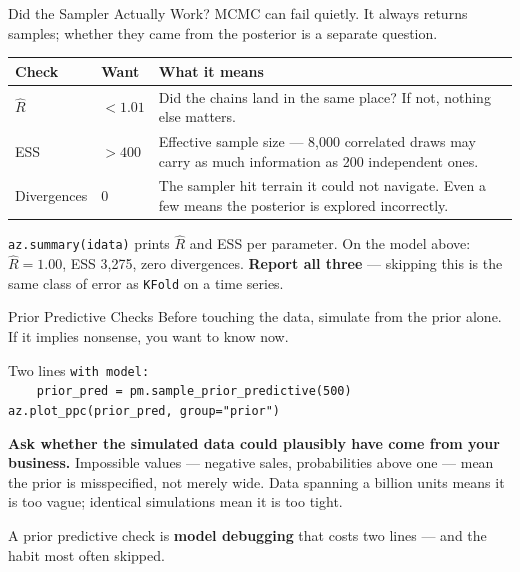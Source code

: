 \documentclass[aspectratio=169, 11pt]{beamer}
\begin{document}
\begin{frame}{Did the Sampler Actually Work? \parencite{MartinKumarLao2021}}
  MCMC can fail quietly. It always returns samples; whether they came from the posterior is a
  separate question.
  \begin{center}
    {\small
    \begin{tabular}{p{2.5cm}p{3.0cm}p{6.6cm}}
      \toprule
      \textbf{Check} & \textbf{Want} & \textbf{What it means} \\
      \midrule
      $\hat{R}$ & $< 1.01$ & Did the chains land in the same place? If not, nothing else
      matters. \\[2pt]
      ESS & $> 400$ & Effective sample size --- 8{,}000 correlated draws may carry as much
      information as 200 independent ones. \\[2pt]
      Divergences & $0$ & The sampler hit terrain it could not navigate. Even a few means the
      posterior is explored incorrectly. \\
      \bottomrule
    \end{tabular}
    }
  \end{center}

  \texttt{az.summary(idata)} prints $\hat{R}$ and ESS per parameter. On the model above:
  $\hat{R} = 1.00$, ESS 3{,}275, zero divergences. \textbf{Report all three} --- skipping this is
  the same class of error as \texttt{KFold} on a time series.
\end{frame}

\begin{frame}{Prior Predictive Checks \parencite{McElreath2020}}
  Before touching the data, simulate from the prior alone. If it implies nonsense, you want to
  know now.

  \begin{examplebox}{Two lines}
    {\scriptsize\linespread{1.0}\selectfont
    \texttt{with model:}\\
    \texttt{\ \ \ \ prior\_pred = pm.sample\_prior\_predictive(500)}\\[2pt]
    \texttt{az.plot\_ppc(prior\_pred, group="prior")}
    }
  \end{examplebox}

  \textbf{Ask whether the simulated data could plausibly have come from your business.}
  Impossible values --- negative sales, probabilities above one --- mean the prior is
  misspecified, not merely wide. Data spanning a billion units means it is too vague; identical
  simulations mean it is too tight.

  \begin{keybox}
    A prior predictive check is \textbf{model debugging} that costs two lines --- and the habit
    most often skipped.
  \end{keybox}
\end{frame}
\end{document}
